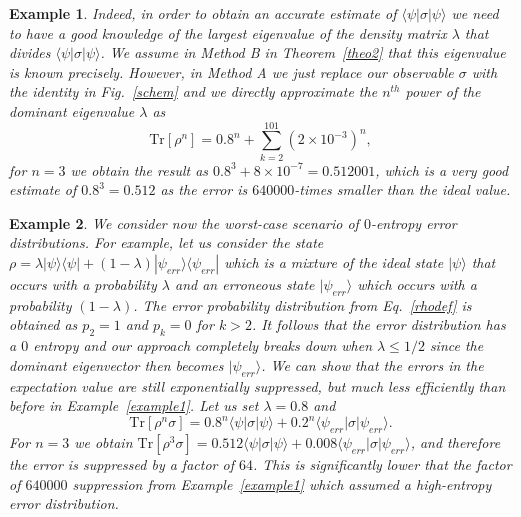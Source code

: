 \documentclass[aps,prx,showpacs,twocolumn,reprint]{revtex4-2}
\newtheorem{example}{Example}
\newcommand{\tr}{\mathrm{Tr}}
\begin{document}
{\begin{example}
	Indeed, in order to obtain an accurate estimate of $\langle\psi |\sigma | \psi \rangle$
	we need to have a good knowledge of the largest eigenvalue of the density
	matrix $\lambda$ that divides $\langle\psi |\sigma | \psi \rangle$.
	We assume in Method B in Theorem~\ref{theo2} that this eigenvalue is known precisely.
	However, in Method A we just replace our observable $\sigma$ with the identity in 
	Fig.~\ref{schem} and we directly approximate the $n^{th}$ power of the dominant eigenvalue
	$\lambda$ as 
	\begin{equation*}
	\tr[\rho^n] = 0.8^n +  \sum_{k=2}^{101} (2 \times 10^{-3})^n,
	\end{equation*}
	for $n=3$ we obtain the result as $0.8^3 + 8 \times 10^{-7} = 0.512001$,
	which is a very good estimate of $0.8^3 = 0.512$ as the error is $640000$-times
	smaller than the ideal value.
\end{example}


\begin{example}\label{example2}
	\normalfont We consider now the worst-case scenario of $0$-entropy error distributions.
	For example, let us consider the state $\rho = \lambda | \psi \rangle \langle  \psi | + (1-\lambda) | \psi_{err} \rangle \langle  \psi_{err} |$
	which is a mixture of the ideal state $ | \psi \rangle $ that occurs with a probability $\lambda$
	and an erroneous state $| \psi_{err} \rangle$ which occurs with a probability $(1-\lambda)$.
	The error probability distribution from Eq.~\eqref{rhodef} is obtained as $p_2 = 1$ and $p_k = 0$
	for $k>2$. It follows that the error distribution has a $0$ entropy and our approach
	completely breaks down when $\lambda \leq 1/2$ since the dominant eigenvector then becomes
	$| \psi_{err} \rangle$. We can show that the errors in the expectation value are still
	exponentially suppressed, but much less efficiently than before in Example~\ref{example1}.
	Let us set $\lambda=0.8$ and 
	\begin{equation*}
	\tr[\rho^n \sigma] = 0.8^n \langle\psi |\sigma | \psi \rangle
	+ 0.2^n  \langle\psi_{err} |\sigma | \psi_{err} \rangle.
	\end{equation*}
	For $n=3$ we obtain $\tr[\rho^3 \sigma] = 0.512 \langle\psi |\sigma | \psi \rangle + 0.008 \langle\psi_{err} |\sigma | \psi_{err} \rangle$,
	and therefore the error is suppressed by a factor of $64$. This is significantly
	lower that the factor of $640000$ suppression from Example~\ref{example1} which 
	assumed a high-entropy error distribution.	 
\end{example}



}
\end{document}
